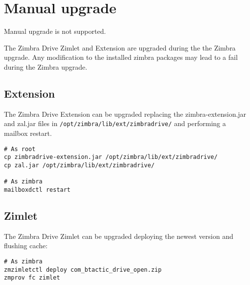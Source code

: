 \section{Manual upgrade}

\begin{comment}
WARNING:
\end{comment}
\begin{warning}
    Manual upgrade is not supported.

    The Zimbra Drive Zimlet and Extension are upgraded during the the Zimbra upgrade.
    Any modification to the installed zimbra packages may lead to a fail during the Zimbra upgrade.
\end{warning}

\subsection{Extension}
The Zimbra Drive Extension can be upgraded replacing the zimbra-extension.jar and zal.jar files in \texttt{/opt/zimbra/lib/ext/zimbradrive/} and performing a mailbox restart.
\begin{verbatim}
# As root
cp zimbradrive-extension.jar /opt/zimbra/lib/ext/zimbradrive/
cp zal.jar /opt/zimbra/lib/ext/zimbradrive/

# As zimbra
mailboxdctl restart
\end{verbatim}

\subsection{Zimlet}
The Zimbra Drive Zimlet can be upgraded deploying the newest version and flushing cache:
\begin{verbatim}
# As zimbra
zmzimletctl deploy com_btactic_drive_open.zip
zmprov fc zimlet
\end{verbatim}
